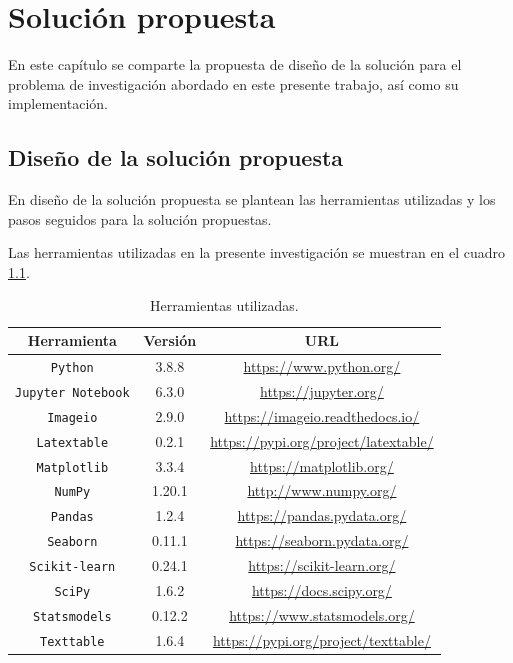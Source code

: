 \chapter{Solución propuesta}

En este capítulo se comparte la propuesta de diseño de la solución para el problema de investigación abordado en este presente trabajo, así como su implementación.

\section{Diseño de la solución propuesta} \label{Diseño de la solución propuesta}
En diseño de la solución propuesta se plantean las herramientas utilizadas y los pasos seguidos para la solución propuestas.

Las herramientas utilizadas en la presente investigación se muestran en el cuadro \ref{tab:Herramientas utilizadas}.

\begin{table}[H]
	{\centering
		\caption{Herramientas utilizadas.}
		\begin{tabular}{|c|c|c|}
			\hline 
			Herramienta & Versión & URL\\
			\hline
			\texttt{Python} & 3.8.8 & \url{https://www.python.org/}\\
			\hline
			\texttt{Jupyter Notebook} & 6.3.0 & \url{https://jupyter.org/}\\
			\hline
			\texttt{Imageio} & 2.9.0 & \url{https://imageio.readthedocs.io/}\\
			\hline
			\texttt{Latextable} & 0.2.1 & \url{https://pypi.org/project/latextable/}\\
			\hline
			\texttt{Matplotlib} & 3.3.4 & \url{https://matplotlib.org/}\\
			\hline
			\texttt{NumPy} & 1.20.1 & \url{http://www.numpy.org/}\\
			\hline
			\texttt{Pandas} & 1.2.4 & \url{https://pandas.pydata.org/}\\
			\hline
			\texttt{Seaborn} & 0.11.1 & \url{https://seaborn.pydata.org/}\\
			\hline
			\texttt{Scikit-learn} & 0.24.1 & \url{https://scikit-learn.org/}\\
			\hline
			\texttt{SciPy} & 1.6.2 & \url{https://docs.scipy.org/}\\
			\hline
			\texttt{Statsmodels} & 0.12.2 & \url{https://www.statsmodels.org/}\\
			\hline
			\texttt{Texttable} & 1.6.4 & \url{https://pypi.org/project/texttable/}\\
			\hline
		\end{tabular}
		
	\label{tab:Herramientas utilizadas}
	}
\end{table}

